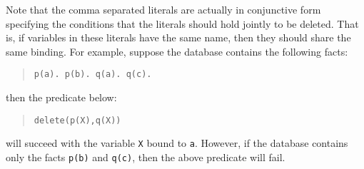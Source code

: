 \documentclass[11pt]{article}
\begin{document}
Note that the comma separated literals are actually in conjunctive
form specifying the conditions that the literals should hold jointly
to be deleted. That is, if variables in these literals have the same
name, then they should share the same binding. For example, suppose
the database contains the following facts:
\begin{quote}
\begin{verbatim}
p(a). p(b). q(a). q(c).
\end{verbatim}
\end{quote}
then the predicate below:
\begin{quote}
\begin{verbatim}
delete(p(X),q(X))
\end{verbatim}
\end{quote}
will succeed with the variable {\tt X} bound to {\tt a}.  However, if
the database contains only the facts {\tt p(b)} and {\tt q(c)}, then
the above predicate will fail.
\end{document}

